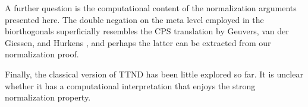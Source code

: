 \documentclass[a4paper,USenglish,cleveref, autoref, thm-restate]{lipics-v2019}
\begin{document}
A further question is the computational content of the normalization
arguments presented here.  The double negation on the meta level
employed in the biorthogonals superficially resembles the CPS
translation by Geuvers, van der Giessen, and Hurkens
\cite{geuversGiessenHurkens:fundinf19}, and perhaps the latter can be
extracted from our normalization proof.

Finally, the classical version of TTND has been little explored so
far.  It is unclear whether it has a computational interpretation that
enjoys the strong normalization property.







\clearpage

\appendix


\end{document}
